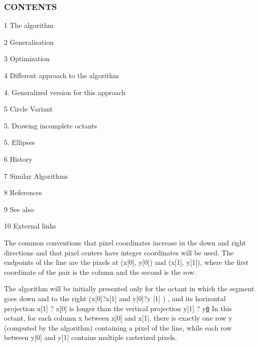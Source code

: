 \subsubsection*{C\+O\+N\+T\+E\+N\+TS}


\begin{DoxyItemize}
\item 1 The algorithm
\item 2 Generalisation
\item 3 Optimisation
\item 4 Different approach to the algorithm
\begin{DoxyItemize}
\item 4. Generalized version for this approach
\end{DoxyItemize}
\item 5 Circle Variant
\begin{DoxyItemize}
\item 5. Drawing incomplete octants
\item 5. Ellipses
\end{DoxyItemize}
\item 6 History
\item 7 Similar Algorithms
\item 8 References
\item 9 See also
\item 10 External links
\end{DoxyItemize}

The common conventions that pixel coordinates increase in the down and right directions and that pixel centers have integer coordinates will be used. The endpoints of the line are the pixels at (x\mbox{[}0\mbox{]}, y\mbox{[}0\mbox{]}) and (x\mbox{[}1\mbox{]}, y\mbox{[}1\mbox{]}), where the first coordinate of the pair is the column and the second is the row.

The algorithm will be initially presented only for the octant in which the segment goes down and to the right (x\mbox{[}0\mbox{]}?x\mbox{[}1\mbox{]} and y\mbox{[}0\mbox{]}?y \mbox{[}1\mbox{]} ) , and its horizontal projection x\mbox{[}1\mbox{]} ? x\mbox{[}0\mbox{]} is longer than the vertical projection y\mbox{[}1\mbox{]} ? y\href{in other words, the line has
 a slope less than 1 and greater than 0.}{\tt 0} In this octant, for each column x between x\mbox{[}0\mbox{]} and x\mbox{[}1\mbox{]}, there is exactly one row y (computed by the algorithm) containing a pixel of the line, while each row between y\mbox{[}0\mbox{]} and y\mbox{[}1\mbox{]} contains multiple rasterized pixels.

